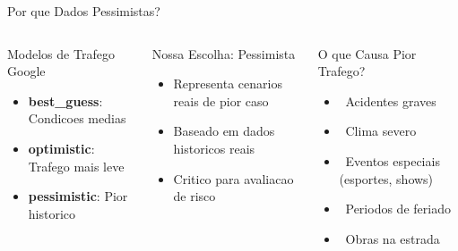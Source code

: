 \documentclass[aspectratio=169,9pt]{beamer}
\begin{document}
\begin{frame}{Por que Dados Pessimistas?}
\begin{columns}
\begin{block}{Modelos de Trafego Google}
\begin{itemize}
    \item \textbf{best\_guess}: Condicoes medias
    \item \textbf{optimistic}: Trafego mais leve
    \item \textcolor{revoRed}{\textbf{pessimistic}}: Pior historico
\end{itemize}
\end{block}

\begin{alertblock}{Nossa Escolha: Pessimista}
\begin{itemize}
    \item Representa cenarios reais de pior caso
    \item Baseado em dados historicos reais
    \item Critico para avaliacao de risco
\end{itemize}
\end{alertblock}

\begin{exampleblock}{O que Causa Pior Trafego?}
\begin{itemize}
    \item \faExclamationTriangle\ Acidentes graves
    \item \faCloudRain\ Clima severo
    \item \faFootballBall\ Eventos especiais (esportes, shows)
    \item \faCalendarAlt\ Periodos de feriado
    \item \faRoad\ Obras na estrada
\end{itemize}
\end{exampleblock}
\end{columns}

\vspace{0.5em}
\begin{center}
\end{center}
\end{frame}
\end{document}

